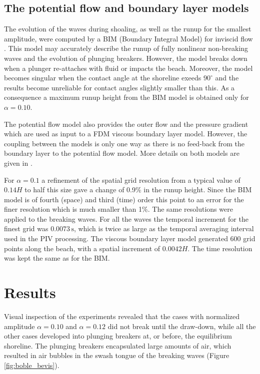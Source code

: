 \documentclass[review, authoryear]{elsarticle}
\newcommand{\s}{\,\mbox{s}}
\begin{document}
\subsection{The potential flow and boundary layer models}
\label{BIMsec}
The evolution of the waves during shoaling, as well as the runup for the smallest amplitude, were 
computed by a BIM (Boundary Integral Model) for  inviscid flow \citep{pedersen2013runup}. This model may accurately describe the runup of fully nonlinear non-breaking waves and the evolution of plunging breakers.
However, the model breaks down when a plunger re-attaches with fluid or impacts the beach. Moreover, the
model  becomes singular when the contact angle at the shoreline exeeds $90^\circ$  and the results  become unreliable for contact angles slightly smaller than this.  As a consequence a maximum runup height from the BIM model is obtained only for $\alpha=0.10$.

The potential flow model also provides the outer flow and the pressure gradient
which are used as input to a FDM viscous boundary layer model. However, the coupling between the
models is only one way as there is no feed-back from the boundary layer to the potential
flow model. 
More details on both models are given in \cite{pedersen2013runup}. 

For $\alpha=0.1$ a refinement of the spatial grid resolution from a typical value of $0.14H$ to half this size  gave a change of 0.9\% in the runup height. 
Since the BIM model is of fourth (space) and third (time) order this point to an error for the finer resolution which is much smaller than 1\%. The same resolutions were applied to the breaking waves.  For all the waves the temporal 
increment for the finest grid was $0.0073\s$, which is twice as large as the temporal averaging interval  used in the PIV processing. The viscous boundary layer model generated 600 grid points along the beach, with a spatial increment of $0.0042H$. The time resolution was kept the same as for the BIM.


\section{Results}
\label{result}

Visual inspection of the experiments revealed that the cases with normalized amplitude $\alpha=0.10$ and $\alpha=0.12$ did not break until the draw-down, while all the other cases developed into plunging breakers at, or before, the equilibrium shoreline. The plunging breakers encapsulated large amounts of air, which resulted in air bubbles in the swash tongue of the breaking waves (Figure \ref{fig:boble_bevis}).
\end{document}
